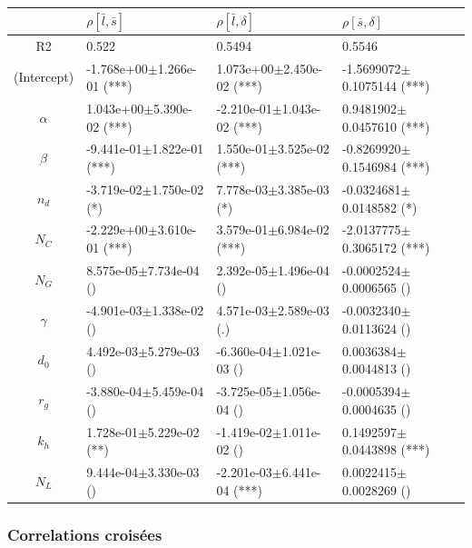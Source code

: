 \begin{center}
\begin{tabular}{|c|p{3.7cm}|p{3.7cm}|p{3.7cm}|}
 \hline
&$\rho [\bar{l},\bar{s}]$&$\rho [\bar{l},\delta]$&$\rho [\bar{s},\delta]$\\\hline
R2&0.522&0.5494&0.5546\\\hline
(Intercept)&-1.768e+00$\pm$1.266e-01 (***)&1.073e+00$\pm$2.450e-02 (***)&-1.5699072$\pm$0.1075144 (***)\\
$\alpha$&1.043e+00$\pm$5.390e-02 (***)&-2.210e-01$\pm$1.043e-02 (***)&0.9481902$\pm$0.0457610 (***)\\
$\beta$&-9.441e-01$\pm$1.822e-01 (***)&1.550e-01$\pm$3.525e-02 (***)&-0.8269920$\pm$0.1546984 (***)\\
$n_d$&-3.719e-02$\pm$1.750e-02 (*)&7.778e-03$\pm$3.385e-03 (*)&-0.0324681$\pm$0.0148582 (*)\\
$N_C$&-2.229e+00$\pm$3.610e-01 (***)&3.579e-01$\pm$6.984e-02 (***)&-2.0137775$\pm$0.3065172 (***)\\
$N_G$&8.575e-05$\pm$7.734e-04 ()&2.392e-05$\pm$1.496e-04 ()&-0.0002524$\pm$0.0006565 ()\\
$\gamma$&-4.901e-03$\pm$1.338e-02 ()&4.571e-03$\pm$2.589e-03 (.)&-0.0032340$\pm$0.0113624 ()\\
$d_0$&4.492e-03$\pm$5.279e-03 ()&-6.360e-04$\pm$1.021e-03 ()&0.0036384$\pm$0.0044813 ()\\
$r_g$&-3.880e-04$\pm$5.459e-04 ()&-3.725e-05$\pm$1.056e-04 ()&-0.0005394$\pm$0.0004635 ()\\
$k_h$&1.728e-01$\pm$5.229e-02 (**)&-1.419e-02$\pm$1.011e-02 ()&0.1492597$\pm$0.0443898 (***)\\
$N_L$&9.444e-04$\pm$3.330e-03 ()&-2.201e-03$\pm$6.441e-04 (***)&0.0022415$\pm$0.0028269 ()\\
 \hline
\end{tabular}


\end{center}



\subsubsection*{Correlations croisées}


